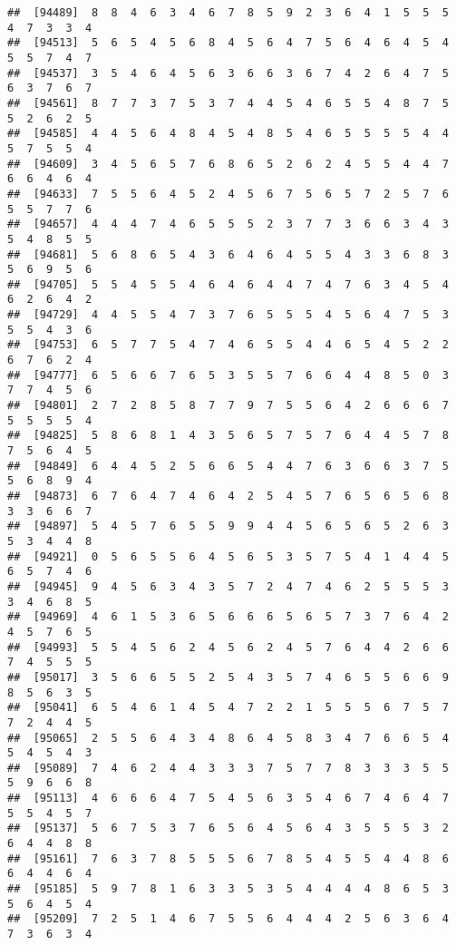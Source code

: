 \documentclass[
]{book}
\begin{document}
\begin{verbatim}
##  [94489]  8  8  4  6  3  4  6  7  8  5  9  2  3  6  4  1  5  5  5  4  7  3  3  4
##  [94513]  5  6  5  4  5  6  8  4  5  6  4  7  5  6  4  6  4  5  4  5  5  7  4  7
##  [94537]  3  5  4  6  4  5  6  3  6  6  3  6  7  4  2  6  4  7  5  6  3  7  6  7
##  [94561]  8  7  7  3  7  5  3  7  4  4  5  4  6  5  5  4  8  7  5  5  2  6  2  5
##  [94585]  4  4  5  6  4  8  4  5  4  8  5  4  6  5  5  5  5  4  4  5  7  5  5  4
##  [94609]  3  4  5  6  5  7  6  8  6  5  2  6  2  4  5  5  4  4  7  6  6  4  6  4
##  [94633]  7  5  5  6  4  5  2  4  5  6  7  5  6  5  7  2  5  7  6  5  5  7  7  6
##  [94657]  4  4  4  7  4  6  5  5  5  2  3  7  7  3  6  6  3  4  3  5  4  8  5  5
##  [94681]  5  6  8  6  5  4  3  6  4  6  4  5  5  4  3  3  6  8  3  5  6  9  5  6
##  [94705]  5  5  4  5  5  4  6  4  6  4  4  7  4  7  6  3  4  5  4  6  2  6  4  2
##  [94729]  4  4  5  5  4  7  3  7  6  5  5  5  4  5  6  4  7  5  3  5  5  4  3  6
##  [94753]  6  5  7  7  5  4  7  4  6  5  5  4  4  6  5  4  5  2  2  6  7  6  2  4
##  [94777]  6  5  6  6  7  6  5  3  5  5  7  6  6  4  4  8  5  0  3  7  7  4  5  6
##  [94801]  2  7  2  8  5  8  7  7  9  7  5  5  6  4  2  6  6  6  7  5  5  5  5  4
##  [94825]  5  8  6  8  1  4  3  5  6  5  7  5  7  6  4  4  5  7  8  7  5  6  4  5
##  [94849]  6  4  4  5  2  5  6  6  5  4  4  7  6  3  6  6  3  7  5  5  6  8  9  4
##  [94873]  6  7  6  4  7  4  6  4  2  5  4  5  7  6  5  6  5  6  8  3  3  6  6  7
##  [94897]  5  4  5  7  6  5  5  9  9  4  4  5  6  5  6  5  2  6  3  5  3  4  4  8
##  [94921]  0  5  6  5  5  6  4  5  6  5  3  5  7  5  4  1  4  4  5  6  5  7  4  6
##  [94945]  9  4  5  6  3  4  3  5  7  2  4  7  4  6  2  5  5  5  3  3  4  6  8  5
##  [94969]  4  6  1  5  3  6  5  6  6  6  5  6  5  7  3  7  6  4  2  4  5  7  6  5
##  [94993]  5  5  4  5  6  2  4  5  6  2  4  5  7  6  4  4  2  6  6  7  4  5  5  5
##  [95017]  3  5  6  6  5  5  2  5  4  3  5  7  4  6  5  5  6  6  9  8  5  6  3  5
##  [95041]  6  5  4  6  1  4  5  4  7  2  2  1  5  5  5  6  7  5  7  7  2  4  4  5
##  [95065]  2  5  5  6  4  3  4  8  6  4  5  8  3  4  7  6  6  5  4  5  4  5  4  3
##  [95089]  7  4  6  2  4  4  3  3  3  7  5  7  7  8  3  3  3  5  5  5  9  6  6  8
##  [95113]  4  6  6  6  4  7  5  4  5  6  3  5  4  6  7  4  6  4  7  5  5  4  5  7
##  [95137]  5  6  7  5  3  7  6  5  6  4  5  6  4  3  5  5  5  3  2  6  4  4  8  8
##  [95161]  7  6  3  7  8  5  5  5  6  7  8  5  4  5  5  4  4  8  6  6  4  4  6  4
##  [95185]  5  9  7  8  1  6  3  3  5  3  5  4  4  4  4  8  6  5  3  5  6  4  5  4
##  [95209]  7  2  5  1  4  6  7  5  5  6  4  4  4  2  5  6  3  6  4  7  3  6  3  4

\end{verbatim}
\end{document}

